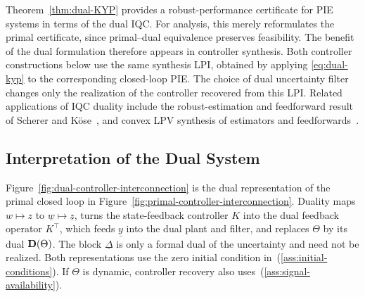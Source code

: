 
Theorem~\ref{thm:dual-KYP} provides a robust-performance certificate for PIE
systems in terms of the dual IQC. For analysis, this merely reformulates the
primal certificate, since primal--dual equivalence preserves feasibility. The
benefit of the dual formulation therefore appears in controller
synthesis. Both controller constructions below use the same synthesis LPI,
obtained by applying \eqref{eq:dual-kyp} to the corresponding closed-loop
PIE. The choice of dual uncertainty filter changes only the realization of the
controller recovered from this LPI. Related applications of IQC duality
include the robust-estimation and feedforward result of Scherer and
K\"ose~\cite{scherer2008robustness,kose2009robust}, and convex LPV synthesis of
estimators and feedforwards~\cite{venkataraman}.

\dualcontrollerfigure

\subsection{Interpretation of the Dual System}
Figure~\ref{fig:dual-controller-interconnection} is the dual representation
of the primal closed loop in
Figure~\ref{fig:primal-controller-interconnection}. Duality maps
$w\mapsto z$ to $\underline w\mapsto\underline z$, turns the state-feedback
controller $K$ into the dual feedback operator $K^\top$, which feeds
$\underline y$ into the dual plant and filter, and replaces $\Theta$ by its
dual $\mathbf{D}(\Theta)$. The block $\underline\Delta$ is only a
formal dual of the uncertainty and need not be realized. Both representations
use the zero initial condition in~(\ref{ass:initial-conditions}). If $\Theta$
is dynamic, controller recovery also uses~(\ref{ass:signal-availability}).

